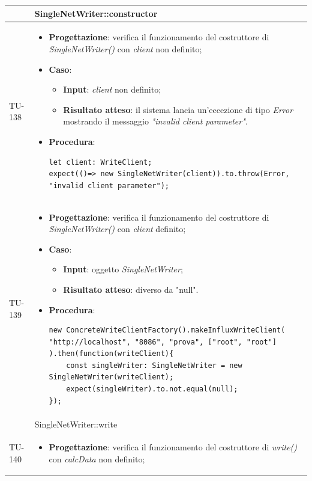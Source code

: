\begin{longtable}{|C{1.5cm}|C{14.5cm}|}
\hline
{} & SingleNetWriter::constructor
\\ \hline
{TU-138} &
\begin{itemize}
	\item \textbf{Progettazione}: verifica il funzionamento del costruttore di \emph{SingleNetWriter()} con \emph{client} non definito;
	\item \textbf{Caso}: 
	\begin{itemize}
		\item \textbf{Input}: \emph{client} non definito;
		\item \textbf{Risultato atteso}: il sistema lancia un'eccezione di tipo \emph{Error} mostrando il messaggio \emph{"invalid client parameter"}.
	\end{itemize}
	\item \textbf{Procedura}:
	\begin{lstlisting}
let client: WriteClient;
expect(()=> new SingleNetWriter(client)).to.throw(Error, "invalid client parameter");
	\end{lstlisting}
\end{itemize}\\
\hline
{TU-139} &
\begin{itemize}
	\item \textbf{Progettazione}: verifica il funzionamento del costruttore di \emph{SingleNetWriter()} con \emph{client} definito;
	\item \textbf{Caso}: 
	\begin{itemize}
		\item \textbf{Input}: oggetto \emph{SingleNetWriter};
		\item \textbf{Risultato atteso}: diverso da "null".
	\end{itemize}
	\item \textbf{Procedura}:
	\begin{lstlisting}
new ConcreteWriteClientFactory().makeInfluxWriteClient(
"http://localhost", "8086", "prova", ["root", "root"]
).then(function(writeClient){
	const singleWriter: SingleNetWriter = new SingleNetWriter(writeClient);
	expect(singleWriter).to.not.equal(null);
});
	\end{lstlisting}
\end{itemize}\\
\hline
{} & SingleNetWriter::write
\\ \hline
{TU-140} &
\begin{itemize}
	\item \textbf{Progettazione}: verifica il funzionamento del costruttore di \emph{write()} con \emph{calcData} non definito;

\end{itemize}
\end{longtable}
